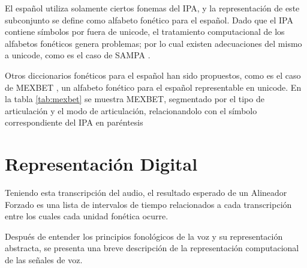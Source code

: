 El español utiliza solamente ciertos fonemas del IPA, y la representación de este subconjunto se define como alfabeto fonético para el español. Dado que el IPA contiene símbolos por fuera de unicode, el tratamiento computacional de los alfabetos fonéticos genera problemas; por lo cual existen adecuaciones del mismo a unicode, como es el caso de SAMPA \cite{SAMPA}. 

Otros diccionarios fonéticos para el español han sido propuestos, como es el caso de MEXBET \cite{mexbet}, un alfabeto fonético para el español representable en unicode. En la tabla \ref{tab:mexbet} se muestra MEXBET, segmentado por el tipo de articulación y el modo de articulación, relacionandolo con el símbolo correspondiente del IPA en paréntesis



\section{Representación Digital}

Teniendo esta transcripción del audio, el resultado esperado de un Alineador Forzado es una lista de intervalos de tiempo relacionados a cada transcripción entre los cuales cada unidad fonética ocurre.

Después de entender los principios fonológicos de la voz y su representación abstracta, se presenta una breve descripción de la representación computacional de las señales de voz.

